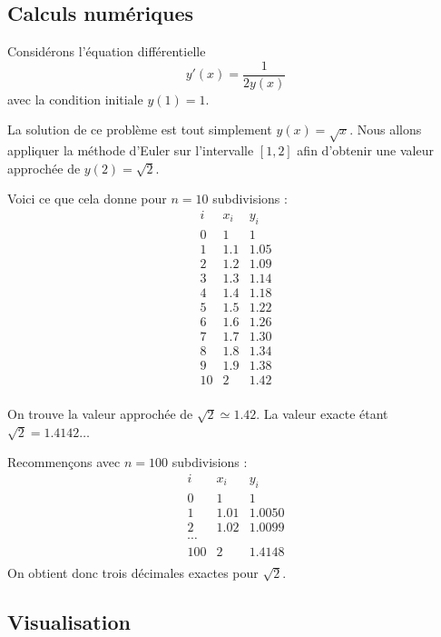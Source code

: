 \documentclass[11pt,class=report,crop=false]{standalone}
\begin{document}
\subsection{Calculs numériques}

Considérons l'équation différentielle 
$$y'(x) = \frac{1}{2y(x)}$$
avec la condition initiale $y(1) = 1$.

La solution de ce problème est tout simplement $y(x) = \sqrt{x}$.
Nous allons appliquer la méthode d'Euler sur l'intervalle $[1,2]$ afin d'obtenir une valeur approchée de $y(2)=\sqrt{2}$.

Voici ce que cela donne pour $n=10$ subdivisions :
$$
\begin{array}{c|c|c}
i & x_i & y_i \\
\hline
0 & 1   & 1 \\
1 & 1.1 & 1.05 \\
2 & 1.2 & 1.09 \\
3 & 1.3 & 1.14 \\
4 & 1.4 & 1.18 \\
5 & 1.5 & 1.22 \\
6 & 1.6 & 1.26 \\
7 & 1.7 & 1.30 \\
8 & 1.8 & 1.34 \\
9 & 1.9 & 1.38 \\
10 & 2  & 1.42 \\    
\end{array}$$

On trouve la valeur approchée de $\sqrt{2} \simeq 1.42$. La valeur exacte étant $\sqrt{2} = 1.4142\dots$


Recommençons avec $n=100$ subdivisions :
$$
\begin{array}{c|c|c}
i & x_i & y_i \\
\hline
0 & 1   & 1 \\
1 & 1.01 & 1.0050 \\
2 & 1.02 & 1.0099 \\
\cdots &  &  \\
100 & 2  & 1.4148 \\    
\end{array}$$
On obtient donc trois décimales exactes pour $\sqrt{2}$.


\subsection{Visualisation}
\end{document}
